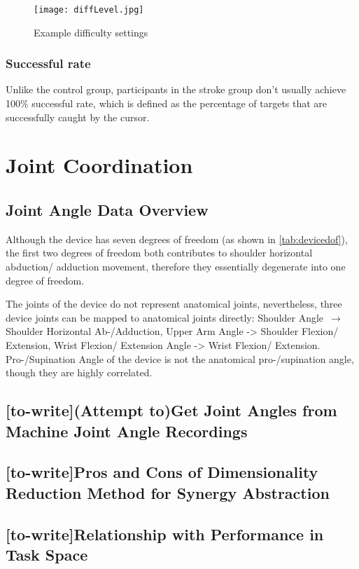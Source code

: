 \begin{figure}
	\texttt{[image: diffLevel.jpg]}
	\centering
	\caption{Example difficulty settings}
	\medskip
	\small 
	\label{fig:diffLevel}
\end{figure}

\subsubsection{Successful rate}

Unlike the control group, participants in the stroke group don't usually achieve 100\% successful rate, which is defined as the percentage of targets that are successfully caught by the cursor. 


\section{Joint Coordination}

\subsection{Joint Angle Data Overview}
Although the device has seven degrees of freedom (as shown in \ref{tab:devicedof}), the first two degrees of freedom both contributes to shoulder horizontal abduction/ adduction movement, therefore they essentially degenerate into one degree of freedom.

The joints of the device do not represent anatomical joints, nevertheless, three device joints can be mapped to anatomical joints directly: Shoulder Angle $\,\to\,$ Shoulder Horizontal Ab-/Adduction, Upper Arm Angle -> Shoulder Flexion/ Extension, Wrist Flexion/ Extension Angle -> Wrist Flexion/ Extension. Pro-/Supination Angle of the device is not the anatomical pro-/supination angle, though they are highly correlated.


\subsection{[to-write](Attempt to)Get Joint Angles from Machine Joint Angle Recordings }
\subsection{[to-write]Pros and Cons of Dimensionality Reduction Method for Synergy Abstraction}
\subsection{[to-write]Relationship with Performance in Task Space}
